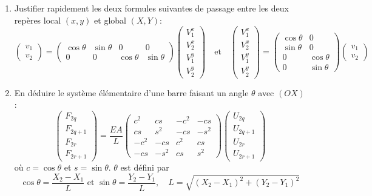 \documentclass[a4paper]{article}
\begin{document}
\begin{enumerate}
\item Justifier rapidement les deux formules suivantes de passage entre les deux repères local $(x,y)$ et global $(X,Y)$:
\[\left(\begin{array}{l} 
v_{1}\\v_{2}
\end{array}\right) = \left(\begin{array}{cccc} 
\cos\theta &\sin\theta&0&0\\
0&0&\cos\theta &\sin\theta
\end{array}\right) \left(\begin{array}{l} 
V_{1}^x\\V_{2}^x\\V_{1}^y\\V_{2}^y
\end{array}\right)  \quad \mbox{et}\quad\left(\begin{array}{l} 
V_{1}^x\\V_{2}^x\\V_{1}^y\\V_{2}^y
\end{array}\right)   = \left(\begin{array}{cc} 
\cos\theta &0\\
\sin\theta& 0\\
0&\cos\theta \\
0 &\sin\theta
\end{array}\right)  \left(\begin{array}{l} 
v_{1}\\v_{2}
\end{array}\right)  \]
\item  En déduire le système élémentaire d'une barre faisant un angle $\theta$ avec $(OX)$:
\[\left(\begin{array}{l} 
F_{2q}\\F_{2q+1}\\F_{2r}\\F_{2r+1}
\end{array}\right)   = \frac{EA}{L}\left(\begin{array}{rrrr} 
c^2&cs&-c^2&-cs\\
cs&s^2&-cs&-s^2\\
-c^2&-cs&c^2&cs\\
-cs&-s^2&cs&s^2
\end{array}\right)\left(\begin{array}{l} 
U_{2q}\\U_{2q+1}\\U_{2r}\\U_{2r+1}
\end{array}\right)  \]
où  $c=\cos\theta$ et $s=\sin\theta$. $\theta$ est défini par
\[\cos \theta = \frac{X_2-X_1}{L}\mbox{ et }\sin \theta = \frac{Y_2-Y_1}{L},\quad L=\sqrt{(X_2-X_1)^2+(Y_2-Y_1)^2} \]
\end{enumerate}
\end{document}
